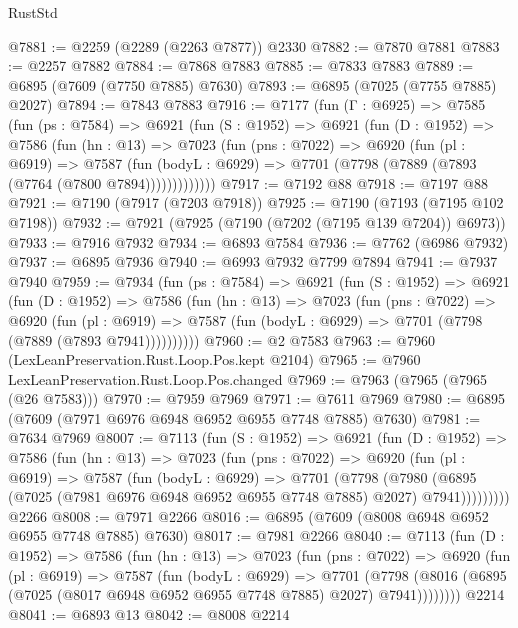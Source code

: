 \begin{lexlean}{RustStd}
\begin{coremodule}
@7881 := @2259 (@2289 (@2263 @7877)) @2330
@7882 := @7870 @7881
@7883 := @2257 @7882
@7884 := @7868 @7883
@7885 := @7833 @7883
@7889 := @6895 (@7609 (@7750 @7885) @7630)
@7893 := @6895 (@7025 (@7755 @7885) @2027)
@7894 := @7843 @7883
@7916 := @7177
    (fun (Γ : @6925) =>
    @7585
      (fun (ps : @7584) =>
      @6921
        (fun (S : @1952) =>
        @6921
          (fun (D : @1952) =>
          @7586
            (fun (hn : @13) =>
            @7023
              (fun (pns : @7022) =>
              @6920
                (fun (pl : @6919) =>
                @7587
                  (fun (bodyL : @6929) =>
                  @7701 (@7798 (@7889 (@7893 (@7764 (@7800 @7894)))))))))))))
@7917 := @7192 @88
@7918 := @7197 @88
@7921 := @7190 (@7917 (@7203 @7918))
@7925 := @7190 (@7193 (@7195 @102 @7198))
@7932 := @7921 (@7925 (@7190 (@7202 (@7195 @139 @7204)) @6973))
@7933 := @7916 @7932
@7934 := @6893 @7584
@7936 := @7762 (@6986 @7932)
@7937 := @6895 @7936
@7940 := @6993 @7932 @7799 @7894
@7941 := @7937 @7940
@7959 := @7934
    (fun (ps : @7584) =>
    @6921
      (fun (S : @1952) =>
      @6921
        (fun (D : @1952) =>
        @7586
          (fun (hn : @13) =>
          @7023
            (fun (pns : @7022) =>
            @6920
              (fun (pl : @6919) =>
              @7587 (fun (bodyL : @6929) => @7701 (@7798 (@7889 (@7893 @7941))))))))))
@7960 := @2 @7583
@7963 := @7960 (LexLeanPreservation.Rust.Loop.Pos.kept @2104)
@7965 := @7960 LexLeanPreservation.Rust.Loop.Pos.changed
@7969 := @7963 (@7965 (@7965 (@26 @7583)))
@7970 := @7959 @7969
@7971 := @7611 @7969
@7980 := @6895 (@7609 (@7971 @6976 @6948 @6952 @6955 @7748 @7885) @7630)
@7981 := @7634 @7969
@8007 := @7113
    (fun (S : @1952) =>
    @6921
      (fun (D : @1952) =>
      @7586
        (fun (hn : @13) =>
        @7023
          (fun (pns : @7022) =>
          @6920
            (fun (pl : @6919) =>
            @7587
              (fun (bodyL : @6929) =>
              @7701
                (@7798
                  (@7980
                    (@6895 (@7025 (@7981 @6976 @6948 @6952 @6955 @7748 @7885) @2027) @7941)))))))))
    @2266
@8008 := @7971 @2266
@8016 := @6895 (@7609 (@8008 @6948 @6952 @6955 @7748 @7885) @7630)
@8017 := @7981 @2266
@8040 := @7113
    (fun (D : @1952) =>
    @7586
      (fun (hn : @13) =>
      @7023
        (fun (pns : @7022) =>
        @6920
          (fun (pl : @6919) =>
          @7587
            (fun (bodyL : @6929) =>
            @7701
              (@7798 (@8016 (@6895 (@7025 (@8017 @6948 @6952 @6955 @7748 @7885) @2027) @7941))))))))
    @2214
@8041 := @6893 @13
@8042 := @8008 @2214

\end{coremodule}
\end{lexlean}
